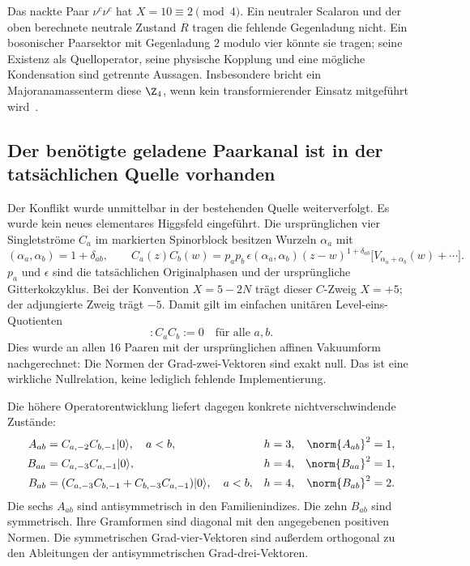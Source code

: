 Das nackte Paar $\nu^c\nu^c$ hat $X=10\equiv2\pmod4$. Ein neutraler Scalaron und der oben berechnete neutrale Zustand $R$ tragen die fehlende Gegenladung nicht. Ein bosonischer Paarsektor mit Gegenladung $2$ modulo vier könnte sie tragen; seine Existenz als Quelloperator, seine physische Kopplung und eine mögliche Kondensation sind getrennte Aussagen. Insbesondere bricht ein Majoranamassenterm diese $\Z_4$, wenn kein transformierender Einsatz mitgeführt wird~\cite{garciamontero}.

\subsection{Der benötigte geladene Paarkanal ist in der tatsächlichen Quelle vorhanden}\label{sec:sourcepairs}
Der Konflikt wurde unmittelbar in der bestehenden Quelle weiterverfolgt. Es wurde kein neues elementares Higgsfeld eingeführt. Die ursprünglichen vier Singletströme $C_a$ im markierten Spinorblock besitzen Wurzeln $\alpha_a$ mit
\begin{equation}
(\alpha_a,\alpha_b)=1+\delta_{ab},\qquad
C_a(z)C_b(w)=p_ap_b\,\epsilon(\alpha_a,\alpha_b)
(z-w)^{1+\delta_{ab}}\bigl[V_{\alpha_a+\alpha_b}(w)+\cdots\bigr].
\end{equation}
$p_a$ und $\epsilon$ sind die tatsächlichen Originalphasen und der ursprüngliche Gitterkokzyklus. Bei der Konvention $X=5-2N$ trägt dieser $C$-Zweig $X=+5$; der adjungierte Zweig trägt $-5$. Damit gilt im einfachen unitären Level-eins-Quotienten
\begin{equation}
\boxed{:C_aC_b:=0\quad\text{für alle }a,b.}
\end{equation}
Dies wurde an allen 16 Paaren mit der ursprünglichen affinen Vakuumform nachgerechnet: Die Normen der Grad-zwei-Vektoren sind exakt null. Das ist eine wirkliche Nullrelation, keine lediglich fehlende Implementierung.

Die höhere Operatorentwicklung liefert dagegen konkrete nichtverschwindende Zustände:
\begin{align}
A_{ab}&=C_{a,-2}C_{b,-1}|0\rangle,\quad a<b,
&h&=3,&\norm{A_{ab}}^2&=1,\\
B_{aa}&=C_{a,-3}C_{a,-1}|0\rangle,
&h&=4,&\norm{B_{aa}}^2&=1,\\
B_{ab}&=(C_{a,-3}C_{b,-1}+C_{b,-3}C_{a,-1})|0\rangle,\quad a<b,
&h&=4,&\norm{B_{ab}}^2&=2.
\end{align}
Die sechs $A_{ab}$ sind antisymmetrisch in den Familienindizes. Die zehn $B_{ab}$ sind symmetrisch. Ihre Gramformen sind diagonal mit den angegebenen positiven Normen. Die symmetrischen Grad-vier-Vektoren sind außerdem orthogonal zu den Ableitungen der antisymmetrischen Grad-drei-Vektoren.

